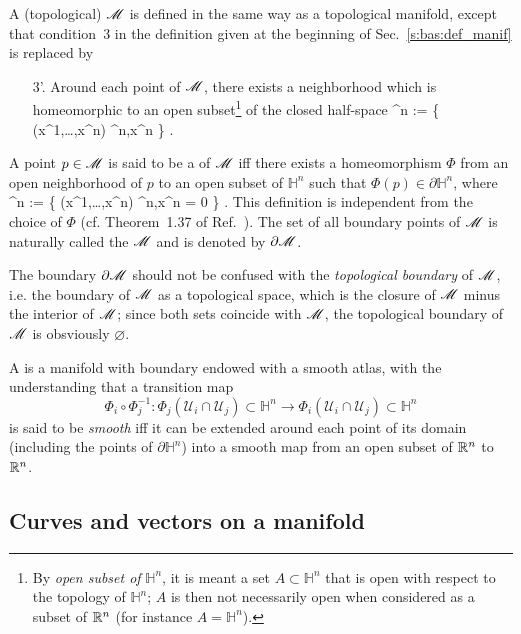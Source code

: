 A (topological)  $\mathscr{M}$ is defined in the same way
as a topological manifold, except that condition~3 in the definition given
at the beginning of Sec.~\ref{s:bas:def_manif} is replaced by
\begin{itemize}
\item[3'.] Around each point of $\mathscr{M}$, there exists a neighborhood which is
homeomorphic to an open subset\footnote{By \emph{open subset of} $\mathbb{H}^n$, it is meant a set $A\subset \mathbb{H}^n$ that is open with respect to the topology of $\mathbb{H}^n$; $A$ is then not necessarily open when considered
as a subset of $\mathbb{R}^n$ (for instance $A=\mathbb{H}^n$).}
of the closed half-space
\be
    ^n := \left\{ (x^1,\ldots,x^n) \in \R^n,\quad x^n  \right\} .
\ee
\end{itemize}
A point $p\in \mathscr{M}$ is said to be a  of $\mathscr{M}$ iff
there exists a homeomorphism $\Phi$ from an open neighborhood of $p$
to an open subset of $\mathbb{H}^n$ such that
$\Phi(p)\in \partial \mathbb{H}^n$, where
\be
    \partial{}^n := \left\{ (x^1,\ldots,x^n) \in \R^n,\quad x^n = 0 \right\} .
\ee
This definition is independent from the choice of $\Phi$ (cf. Theorem~1.37 of
Ref.~\cite{Lee13}).
The set of all boundary points of $\mathscr{M}$ is naturally called the
 $\mathscr{M}$ and is denoted by
$\partial\mathscr{M}$.
\begin{remark}
\label{r:bas:manifold_boundary}
The boundary $\partial\mathscr{M}$ should not be confused with the \emph{topological boundary}
of $\mathscr{M}$, i.e. the boundary of $\mathscr{M}$ as a topological space, which is
the closure of $\mathscr{M}$ minus the interior of $\mathscr{M}$; since
both sets coincide with $\mathscr{M}$, the topological boundary of $\mathscr{M}$
is obsviously $\varnothing$.
\end{remark}

A  is a manifold with boundary endowed with a
smooth atlas, with the understanding that a transition map
\[
    \Phi_i \circ \Phi_j^{-1} : \Phi_j(\mathscr{U}_i \cap \mathscr{U}_j)
    \subset \mathbb{H}^n \longrightarrow \Phi_i(\mathscr{U}_i \cap \mathscr{U}_j)
    \subset \mathbb{H}^n
\]
is said to be \emph{smooth} iff
it can be extended around each point of its domain
(including the points of $\partial\mathbb{H}^n$) into a smooth map
from an open subset of $\mathbb{R}^n$ to $\mathbb{R}^n$.

\subsection{Curves and vectors on a manifold} \label{s:bas:vectors}

